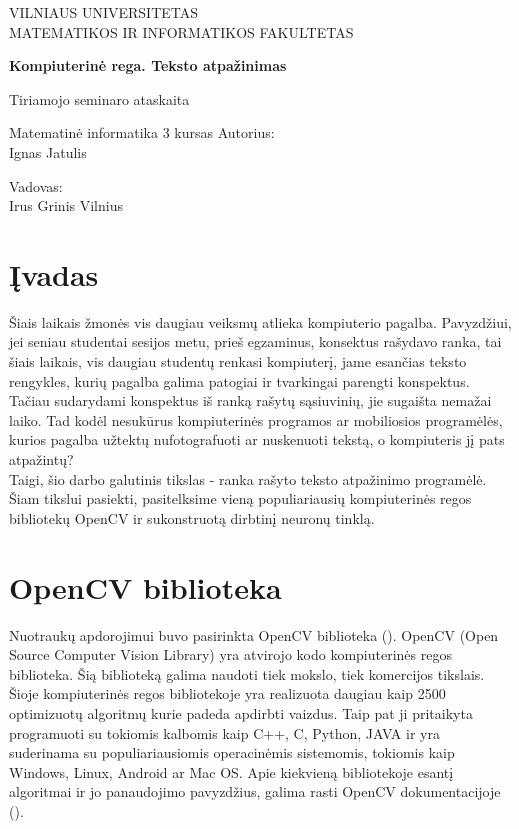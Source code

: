 \documentclass[a4paper,12pt]{article}
\begin{document}
\begin{titlepage}
	\centering
	{\scshape\large VILNIAUS UNIVERSITETAS \\
	MATEMATIKOS IR INFORMATIKOS FAKULTETAS \par}
	\vspace{6cm}
	{\huge\bfseries Kompiuterinė rega. Teksto atpažinimas\par}
	{\LARGE Tiriamojo seminaro ataskaita\par}
	{\Large Matematinė informatika 3 kursas}
	\vspace{3cm}
	\vfill
	\flushright
	Autorius: \\ Ignas Jatulis\par
	\vspace{0.5cm}
	Vadovas: \\ Irus Grinis
	\vfill
	\centering
	Vilnius\\
	{\the\year}
\end{titlepage}	
\tableofcontents

\newpage
\section*{Įvadas}

Šiais laikais žmonės vis daugiau veiksmų atlieka kompiuterio pagalba. Pavyzdžiui, jei seniau studentai sesijos metu, prieš egzaminus, konsektus rašydavo ranka, tai šiais laikais, vis daugiau studentų renkasi kompiuterį, jame esančias teksto rengykles, kurių pagalba galima patogiai ir tvarkingai parengti konspektus. Tačiau sudarydami konspektus iš ranką rašytų sąsiuvinių, jie sugaišta nemažai laiko.  Tad kodėl nesukūrus kompiuterinės programos ar mobiliosios programėlės, kurios pagalba užtektų nufotografuoti ar nuskenuoti tekstą, o kompiuteris jį pats atpažintų? \\
\indent Taigi, šio darbo galutinis tikslas - ranka rašyto teksto atpažinimo programėlė. Šiam tikslui pasiekti, pasitelksime vieną populiariausių kompiuterinės regos bibliotekų OpenCV ir sukonstruotą dirbtinį neuronų tinklą.

\newpage
\section{OpenCV biblioteka}
Nuotraukų apdorojimui buvo pasirinkta OpenCV biblioteka  (\cite{OpenCVabout}). OpenCV (Open Source Computer Vision Library) yra atvirojo kodo kompiuterinės regos biblioteka. Šią biblioteką galima naudoti tiek mokslo, tiek komercijos tikslais.\\
\indent Šioje kompiuterinės regos bibliotekoje yra realizuota daugiau kaip 2500 optimizuotų algoritmų kurie padeda apdirbti vaizdus. Taip pat ji pritaikyta programuoti su tokiomis kalbomis kaip C++, C, Python, JAVA ir yra suderinama su populiariausiomis operacinėmis sistemomis, tokiomis kaip Windows, Linux, Android ar Mac OS. Apie kiekvieną bibliotekoje esantį algoritmai ir jo panaudojimo pavyzdžius, galima rasti OpenCV dokumentacijoje  (\cite{OpenCVdoc}).
\end{document}
